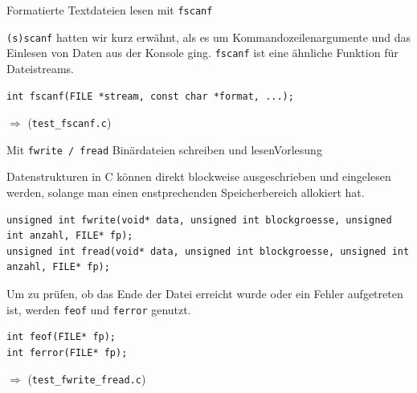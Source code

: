 \documentclass[xcolor=dvipsnames]{beamer}
\newcounter{lecturecounter}
\begin{document}
\begin{frame}[fragile]{Formatierte Textdateien lesen mit \texttt{fscanf}}
\begin{block}{}
  \texttt{(s)scanf} hatten wir kurz erwähnt, als es um Kommandozeilenargumente und das Einlesen von Daten aus der Konsole ging. \verb|fscanf| ist eine ähnliche Funktion für Dateistreams.
\end{block}
\begin{lstlisting}
int fscanf(FILE *stream, const char *format, ...);
\end{lstlisting}
$\Rightarrow$ (\verb|test_fscanf.c|)
\end{frame}

\begin{frame}[fragile]{Mit \texttt{fwrite / fread} Binärdateien schreiben und lesen}{Vorlesung }
\begin{block}{}
  Datenstrukturen in C können direkt blockweise ausgeschrieben und eingelesen werden, solange man einen enstprechenden Speicherbereich allokiert hat.
\end{block}
\begin{lstlisting}
unsigned int fwrite(void* data, unsigned int blockgroesse, unsigned int anzahl, FILE* fp);
unsigned int fread(void* data, unsigned int blockgroesse, unsigned int anzahl, FILE* fp);
\end{lstlisting}
\begin{block}{}
  Um zu prüfen, ob das Ende der Datei erreicht wurde oder ein Fehler aufgetreten ist, werden \texttt{feof} und \texttt{ferror} genutzt.
\end{block}
\begin{lstlisting}
int feof(FILE* fp);
int ferror(FILE* fp);
\end{lstlisting}
$\Rightarrow$ (\verb|test_fwrite_fread.c|) 
\end{frame}
\end{document}
